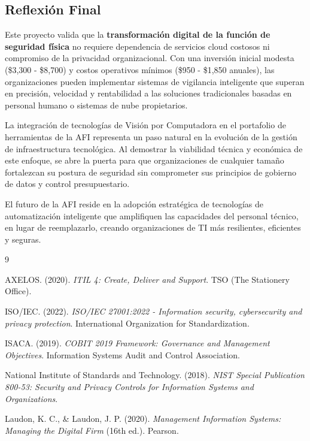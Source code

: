 \documentclass[12pt, a4paper]{article}
\begin{document}
\begin{itemize}
\subsection{Reflexión Final}
Este proyecto valida que la \textbf{transformación digital de la función de seguridad física} no requiere dependencia de servicios cloud costosos ni compromiso de la privacidad organizacional. Con una inversión inicial modesta (\$3,300 - \$8,700) y costos operativos mínimos (\$950 - \$1,850 anuales), las organizaciones pueden implementar sistemas de vigilancia inteligente que superan en precisión, velocidad y rentabilidad a las soluciones tradicionales basadas en personal humano o sistemas de nube propietarios.

La integración de tecnologías de Visión por Computadora en el portafolio de herramientas de la AFI representa un paso natural en la evolución de la gestión de infraestructura tecnológica. Al demostrar la viabilidad técnica y económica de este enfoque, se abre la puerta para que organizaciones de cualquier tamaño fortalezcan su postura de seguridad sin comprometer sus principios de gobierno de datos y control presupuestario.

El futuro de la AFI reside en la adopción estratégica de tecnologías de automatización inteligente que amplifiquen las capacidades del personal técnico, en lugar de reemplazarlo, creando organizaciones de TI más resilientes, eficientes y seguras.

\newpage

\begin{thebibliography}{9}

AXELOS. (2020). \textit{ITIL 4: Create, Deliver and Support}. TSO (The Stationery Office).

ISO/IEC. (2022). \textit{ISO/IEC 27001:2022 - Information security, cybersecurity and privacy protection}. International Organization for Standardization.

ISACA. (2019). \textit{COBIT 2019 Framework: Governance and Management Objectives}. Information Systems Audit and Control Association.

National Institute of Standards and Technology. (2018). \textit{NIST Special Publication 800-53: Security and Privacy Controls for Information Systems and Organizations}.

Laudon, K. C., \& Laudon, J. P. (2020). \textit{Management Information Systems: Managing the Digital Firm} (16th ed.). Pearson.


\end{thebibliography}
\end{itemize}
\end{document}
